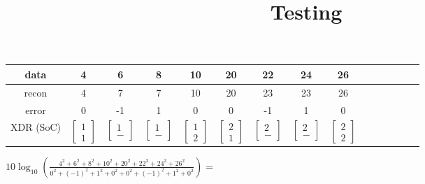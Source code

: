 \documentclass{article}
\title{Testing}
\newcommand{\da}{$\left[\begin{array}{llll}1 \\ 1\end{array}\right]$}
\newcommand{\db}{$\left[\begin{array}{llll}1 \\ -\end{array}\right]$}
\newcommand{\dc}{$\left[\begin{array}{llll}1 \\ -\end{array}\right]$}
\newcommand{\dd}{$\left[\begin{array}{llll}1 \\ 2\end{array}\right]$}
\newcommand{\de}{$\left[\begin{array}{llll}2 \\ 1\end{array}\right]$}
\newcommand{\df}{$\left[\begin{array}{llll}2 \\ -\end{array}\right]$}
\newcommand{\dg}{$\left[\begin{array}{llll}2 \\ -\end{array}\right]$}
\newcommand{\di}{$\left[\begin{array}{llll}2 \\ 2\end{array}\right]$}
\begin{document}
\date{}
\maketitle

\begin{table}
\begin{tabular}{|c|c|c|c|c|c|c|c|c|c|c|c|c|c|c|}\hline
data   			& 4 & 6 & 8 & 10 & 20 & 22 & 24 & 26\\\hline
recon 			& 4 & 7 & 7 & 10 & 20 & 23 & 23 & 26\\\hline
error 			& 0 & -1 & 1 & 0 & 0 & -1 & 1 & 0\\\hline
XDR (SoC)		& \da & \db & \dc & \dd & \de & \df & \dg & \di \\\hline
\end{tabular}
\end{table}

$
10 \log_{10}\left(\frac{4^2 + 6^2 + 8^2 + 10^2 + 20^2 + 22^2 + 24^2 + 26^2}{0^2 + (-1)^2 + 1^2 + 0^2 + 0^2 + (-1)^2 + 1^2 + 0^2 }\right) = 
$

%
%  
\end{document}

